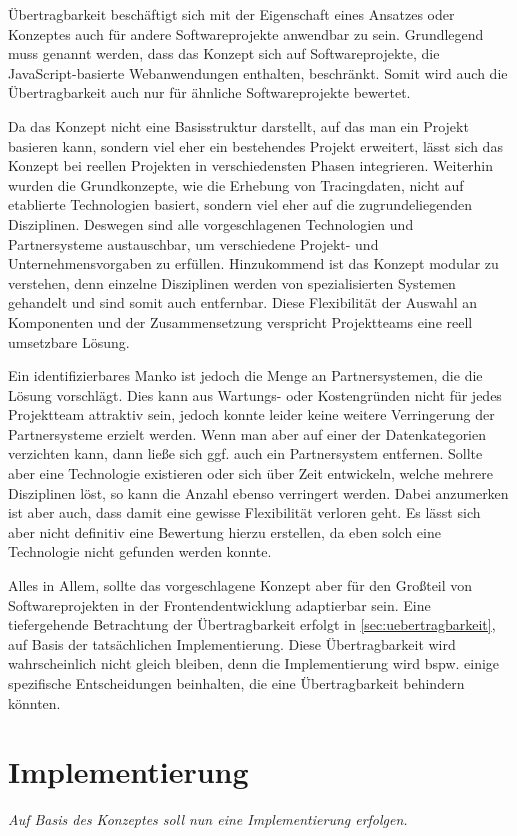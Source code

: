 	Übertragbarkeit beschäftigt sich mit der Eigenschaft eines Ansatzes oder Konzeptes auch für andere Softwareprojekte anwendbar zu sein. Grundlegend muss genannt werden, dass das Konzept sich auf Softwareprojekte, die JavaScript-basierte Webanwendungen enthalten, beschränkt. Somit wird auch die Übertragbarkeit auch nur für ähnliche Softwareprojekte bewertet.
	
	Da das Konzept nicht eine Basisstruktur darstellt, auf das man ein Projekt basieren kann, sondern viel eher ein bestehendes Projekt erweitert, lässt sich das Konzept bei reellen Projekten in verschiedensten Phasen integrieren. Weiterhin wurden die Grundkonzepte, wie die Erhebung von Tracingdaten, nicht auf etablierte Technologien basiert, sondern viel eher auf die zugrundeliegenden Disziplinen. Deswegen sind alle vorgeschlagenen Technologien und Partnersysteme austauschbar, um verschiedene Projekt- und Unternehmensvorgaben zu erfüllen. Hinzukommend ist das Konzept modular zu verstehen, denn einzelne Disziplinen werden von spezialisierten Systemen gehandelt und sind somit auch entfernbar. Diese Flexibilität der Auswahl an Komponenten und der Zusammensetzung verspricht Projektteams eine reell umsetzbare Lösung.

	Ein identifizierbares Manko ist jedoch die Menge an Partnersystemen, die die Lösung vorschlägt. Dies kann aus Wartungs- oder Kostengründen nicht für jedes Projektteam attraktiv sein, jedoch konnte leider keine weitere Verringerung der Partnersysteme erzielt werden. Wenn man aber auf einer der Datenkategorien verzichten kann, dann ließe sich ggf. auch ein Partnersystem entfernen. Sollte aber eine Technologie existieren oder sich über Zeit entwickeln, welche mehrere Disziplinen löst, so kann die Anzahl ebenso verringert werden. Dabei anzumerken ist aber auch, dass damit eine gewisse Flexibilität verloren geht. Es lässt sich aber nicht definitiv eine Bewertung hierzu erstellen, da eben solch eine Technologie nicht gefunden werden konnte.
	
	Alles in Allem, sollte das vorgeschlagene Konzept aber für den Großteil von Softwareprojekten in der Frontendentwicklung adaptierbar sein. Eine tiefergehende Betrachtung der Übertragbarkeit erfolgt in \autoref{sec:uebertragbarkeit}, auf Basis der tatsächlichen Implementierung. Diese Übertragbarkeit wird wahrscheinlich nicht gleich bleiben, denn die Implementierung wird bspw. einige spezifische Entscheidungen beinhalten, die eine Übertragbarkeit behindern könnten.

\section{Implementierung}

	\textit{Auf Basis des Konzeptes soll nun eine Implementierung erfolgen.}